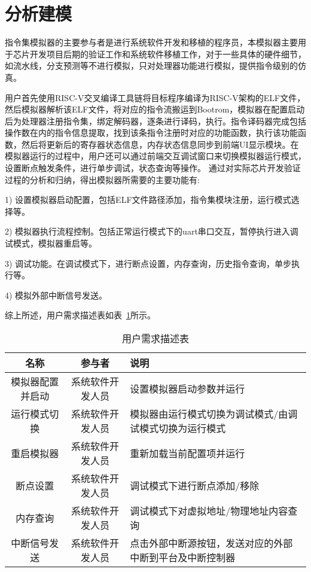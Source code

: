 \section{分析建模}

指令集模拟器的主要参与者是进行系统软件开发和移植的程序员，本模拟器主要用于芯片开发项目后期的验证工作和系统软件移植工作，对于一些具体的硬件细节，如流水线，分支预测等不进行模拟，只对处理器功能进行模拟，提供指令级别的仿真。


用户首先使用RISC-V交叉编译工具链将目标程序编译为RISC-V架构的ELF文件，然后模拟器解析该ELF文件，将对应的指令流搬运到Bootrom，模拟器在配置启动后为处理器注册指令集，绑定解码器，逐条进行译码，执行。指令译码器完成包括操作数在内的指令信息提取，找到该条指令注册时对应的功能函数，执行该功能函数，然后将更新后的寄存器状态信息，内存状态信息同步到前端UI显示模块。在模拟器运行的过程中，用户还可以通过前端交互调试窗口来切换模拟器运行模式，设置断点触发条件，进行单步调试，状态查询等操作。
通过对实际芯片开发验证过程的分析和归纳，得出模拟器所需要的主要功能有:


1) 设置模拟器启动配置，包括ELF文件路径添加，指令集模块注册，运行模式选择等。


2) 模拟器执行流程控制。包括正常运行模式下的uart串口交互，暂停执行进入调试模式，模拟器重启等。


3) 调试功能。在调试模式下，进行断点设置，内存查询，历史指令查询，单步执行等。


4) 模拟外部中断信号发送。


综上所述，用户需求描述表如表~\ref{tab:tab1}所示。
\begin{table}[H]
  \centering
  \caption{用户需求描述表}
  \label{tab:tab1}
  \renewcommand\arraystretch{1.2}
  \begin{tabular}{ccl}
    \toprule
    名称   & 参与者   & 说明   \\
    \midrule
    模拟器配置并启动 & 系统软件开发人员 & \multicolumn{1}{p{6cm}}{设置模拟器启动参数并运行} \\ \hline
    运行模式切换 &	系统软件开发人员	& \multicolumn{1}{m{6cm}}{模拟器由运行模式切换为调试模式/由调试模式切换为运行模式}\\
    \hline
    重启模拟器	& 系统软件开发人员	& \multicolumn{1}{p{6cm}}{重新加载当前配置项并运行}\\
    \hline
    断点设置 &	系统软件开发人员 &	\multicolumn{1}{p{6cm}}{调试模式下进行断点添加/移除}\\
    \hline
    内存查询 &	系统软件开发人员 &	\multicolumn{1}{m{6cm}}{调试模式下对虚拟地址/物理地址内容查询}\\
    \hline
    中断信号发送	& 系统软件开发人员 &	\multicolumn{1}{m{6cm}}{点击外部中断源按钮，发送对应的外部中断到平台及中断控制器}\\
    \bottomrule
  \end{tabular}
\end{table}


